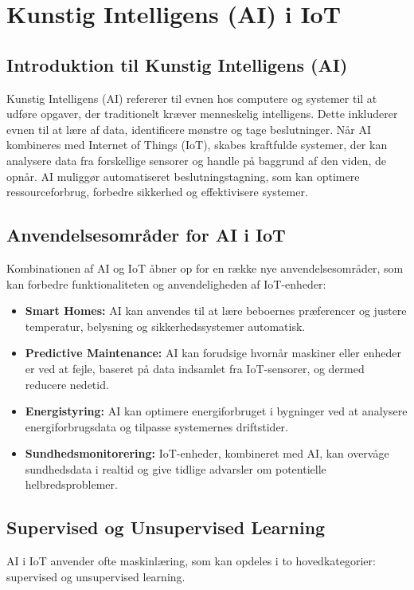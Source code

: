 \section{Kunstig Intelligens (AI) i IoT}
\subsection{Introduktion til Kunstig Intelligens (AI)}
Kunstig Intelligens (AI) refererer til evnen hos computere og systemer til at udføre opgaver, der traditionelt kræver menneskelig intelligens. Dette inkluderer evnen til at lære af data, identificere mønstre og tage beslutninger. Når AI kombineres med Internet of Things (IoT), skabes kraftfulde systemer, der kan analysere data fra forskellige sensorer og handle på baggrund af den viden, de opnår. AI muliggør automatiseret beslutningstagning, som kan optimere ressourceforbrug, forbedre sikkerhed og effektivisere systemer.

\subsection{Anvendelsesområder for AI i IoT}
Kombinationen af AI og IoT åbner op for en række nye anvendelsesområder, som kan forbedre funktionaliteten og anvendeligheden af IoT-enheder:
\begin{itemize}
	\item \textbf{Smart Homes:} AI kan anvendes til at lære beboernes præferencer og justere temperatur, belysning og sikkerhedssystemer automatisk.
	\item \textbf{Predictive Maintenance:} AI kan forudsige hvornår maskiner eller enheder er ved at fejle, baseret på data indsamlet fra IoT-sensorer, og dermed reducere nedetid.
	\item \textbf{Energistyring:} AI kan optimere energiforbruget i bygninger ved at analysere energiforbrugsdata og tilpasse systemernes driftstider.
	\item \textbf{Sundhedsmonitorering:} IoT-enheder, kombineret med AI, kan overvåge sundhedsdata i realtid og give tidlige advarsler om potentielle helbredsproblemer.
\end{itemize}

\subsection{Supervised og Unsupervised Learning}
AI i IoT anvender ofte maskinlæring, som kan opdeles i to hovedkategorier: supervised og unsupervised learning.

